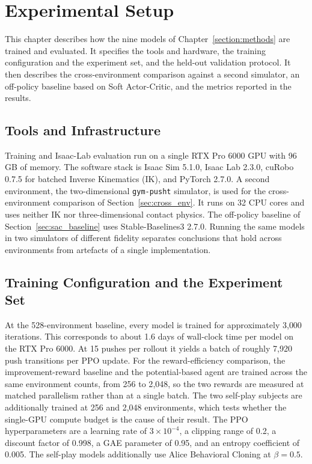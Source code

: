 \section{Experimental Setup}
\label{sec:experiments}

This chapter describes how the nine models of Chapter~\ref{section:methods} are
trained and evaluated. It specifies the tools and hardware, the training
configuration and the experiment set, and the held-out validation protocol. It
then describes the cross-environment comparison against a second simulator, an
off-policy baseline based on Soft Actor-Critic, and the metrics reported in the
results.

\subsection{Tools and Infrastructure}
\label{sec:tools}

Training and Isaac-Lab evaluation run on a single RTX Pro 6000 GPU with 96\,GB of
memory. The software stack is Isaac Sim 5.1.0, Isaac Lab 2.3.0, cuRobo 0.7.5 for
batched Inverse Kinematics (IK), and PyTorch 2.7.0. A second environment, the
two-dimensional \texttt{gym-pusht} simulator, is used for the cross-environment
comparison of Section~\ref{sec:cross_env}. It runs on 32 CPU cores and uses
neither IK nor three-dimensional contact physics. The off-policy baseline of
Section~\ref{sec:sac_baseline} uses Stable-Baselines3 2.7.0. Running the same
models in two simulators of different fidelity separates conclusions that hold
across environments from artefacts of a single implementation.

\subsection{Training Configuration and the Experiment Set}
\label{sec:train_config}

At the 528-environment baseline, every model is trained for approximately 3{,}000
iterations. This corresponds to about 1.6 days of wall-clock time per model on the
RTX Pro 6000. At 15 pushes per rollout it yields a batch of roughly 7{,}920 push
transitions per PPO update. For the reward-efficiency comparison, the
improvement-reward baseline and the potential-based agent are trained across the
same environment counts, from 256 to 2{,}048, so the two rewards are measured at
matched parallelism rather than at a single batch. The two self-play subjects are
additionally trained at 256 and 2{,}048 environments, which tests whether the
single-GPU compute budget is the cause of their result. The PPO hyperparameters are
a learning rate of $3\times10^{-4}$, a clipping range of 0.2, a discount factor of
0.998, a GAE parameter of 0.95, and an entropy coefficient of 0.005. The self-play
models additionally use Alice Behavioral Cloning at $\beta = 0.5$.

